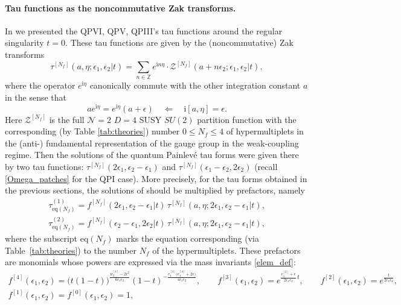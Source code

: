 \documentclass[12pt,a4paper]{article}
\numberwithin{equation}{section}
\newcommand{\ri}{\mathrm{i}}
\begin{document}
\paragraph{Tau functions as the noncommutative Zak transforms.} In \cite[Sec. 2,3]{BST25} we presented the QPVI, QPV, QPIII's tau functions around the regular singularity $t=0$. These tau functions are given by the (noncommutative) Zak transforms
\begin{equation}\label{Zak_ncmt_weak}
\tau^{[N_f]}(a,\eta;\epsilon_1,\epsilon_2|t)=\sum_{n\in\mathbb{Z}}e^{\ri n \eta }\cdot\mathcal{Z}^{[N_f]}(a+n\epsilon_2;\epsilon_1,\epsilon_2|t), 
\end{equation}
where the operator $e^{\ri\eta}$ canonically commute with the other integration constant $a$ in the sense that
\begin{equation}\label{as_comm_rel}
a e^{\ri \eta}=e^{\ri \eta} (a+\epsilon) \quad \Leftarrow \quad \ri [a,\eta]=\epsilon.    
\end{equation}
Here $\mathcal{Z}^{[N_f]}$ is the full $\mathcal{N}=2$ $D=4$ SUSY $SU(2)$ partition function 
with the corresponding (by Table \ref{tab:theories}) number $0\leq N_f\leq4$ of hypermultiplets in the (anti-) fundamental representation of the gauge group in the weak-coupling regime. Then the solutions of the quantum Painlev\'e tau forms were given there by two tau functions: $\tau^{[N_f]}(2\epsilon_1,\epsilon_2{-}\epsilon_1)$ and $\tau^{[N_f]}(\epsilon_1{-}\epsilon_2,2\epsilon_2)$ (recall \eqref{Omega_patches} for the QPI case). More precisely, for the tau forms obtained in the previous sections, the solutions of \cite{BST25} should be multiplied by prefactors, namely
\begin{equation}
\begin{aligned}
\label{tau_factor}
\tau^{(1)}_{\textrm{eq}(N_f)}=f^{[N_f]}(2\epsilon_1,\epsilon_2{-}\epsilon_1|t)\, \tau^{[N_f]}(a,\eta; 2\epsilon_1,\epsilon_2{-}\epsilon_1|t), \\ \tau^{(2)}_{\textrm{eq}(N_f)}=f^{[N_f]}(\epsilon_2{-}\epsilon_1,2\epsilon_2|t)\, \tau^{[N_f]}(a,\eta;2\epsilon_1,\epsilon_2{-}\epsilon_1|t),
\end{aligned}
\end{equation}
where the subscript $\textrm{eq}(N_f)$ marks the equation corresponding (via Table~\ref{tab:theories}) to the number $N_f$ of the hypermultiplets. These prefactors are monomials whose powers are expressed via the mass invariants \eqref{elem_def}:
\begin{multline}\label{prefactors_weak}
f^{[4]}(\epsilon_1,\epsilon_2)=\big(t(1{-}t)\big)^{\frac{w_2^{[4]}{-}2\epsilon^2}{6\epsilon_1\epsilon_2}}(1{-}t)^{-\frac{e_1^{[4]}\big( e_1^{[4]}{+}2\epsilon\big)}{4\epsilon_1\epsilon_2}}, \qquad  f^{[3]}(\epsilon_1,\epsilon_2)=e^{\frac{e_1^{[3]}+\epsilon}{2\epsilon_1\epsilon_2}\,t},  \qquad f^{[2]}(\epsilon_1,\epsilon_2)=e^{\frac{t}{2\epsilon_1\epsilon_2}}, \\  f^{[1]}(\epsilon_1,\epsilon_2)=f^{[0]}(\epsilon_1,\epsilon_2)=1,
\end{multline}
\end{document}

